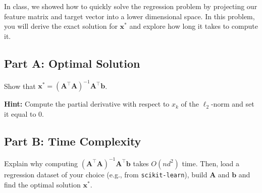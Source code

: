 \documentclass{article}
\begin{document}
In class, we showed how to quickly solve the regression problem by projecting our feature matrix and target vector into a lower dimensional space. In this problem, you will derive the exact solution for \(\mathbf{x}^*\) and explore how long it takes to compute it.

\hypertarget{part-a-optimal-solution}{%
\subsection*{Part A: Optimal Solution}\label{part-a-optimal-solution}}

Show that \(\mathbf{x}^* = \left(\mathbf{A}^\top \mathbf{A} \right)^{-1} \mathbf{A}^\top \mathbf{b}\).

\textbf{Hint:} Compute the partial derivative with respect to \(x_k\) of the \(\ell_2\)-norm and set it equal to 0.

\hypertarget{part-b-time-complexity}{%
\subsection*{Part B: Time Complexity}\label{part-b-time-complexity}}

Explain why computing \(\left(\mathbf{A}^\top \mathbf{A} \right)^{-1} \mathbf{A}^\top \mathbf{b}\) takes \(O(nd^2)\) time. Then, load a regression dataset of your choice (e.g., from \texttt{scikit-learn}), build \(\mathbf{A}\) and \(\mathbf{b}\) and find the optimal solution \(\mathbf{x}^*\).
\end{document}
